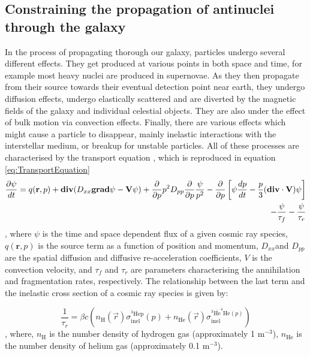 \subsection{Constraining the propagation of antinuclei through the galaxy}\label{sec:Propagation}
In the process of propagating thorough our galaxy, particles undergo several different effects. They get produced at various points in both space and time, for example most heavy nuclei are produced in supernovae\cite{}. As they then propagate from their source towards their eventual detection point near earth, they undergo diffusion effects, undergo elastically scattered and are diverted by the magnetic fields of the galaxy and individual celestial objects. They are also under the effect of bulk motion via convection effects. Finally, there are various effects which might cause a particle to disappear, mainly inelastic interactions with the interstellar medium, or breakup for unstable particles. All of these processes are characterised by the transport equation \cite{}, which is reproduced in equation \ref{eq:TransportEquation}
\begin{equation}
    \label{eq:TransportEquation}
    \centering
    \begin{split}
        \frac{\partial\psi}{dt} = q(\textbf{r},p) 
        + \mathrm{\textbf{div}}(D_{xx}\mathrm{\textbf{grad}}\psi - \textbf{V}\psi) + \frac{\partial}{\partial p}p^2D_{pp} \frac{\partial}{\partial p}\frac{\psi}{p^2} - \frac{\partial}{\partial p} \left[ \psi \frac{dp}{d t}   -\frac{p}{3} (\mathrm{\textbf{div}}\cdot  \mathrm{\textbf{V}} )\psi              \right] \\ 
        - \frac{\psi}{\tau_f}-\frac{\psi}{\tau_r}
    \end{split}
\end{equation}
, where $\psi$ is the time and space dependent flux of a given cosmic ray species, $q(\textbf{r},p)$ is the source term as a function of position and momentum, $D_{xx}$and $D_{pp}$ are the spatial diffusion and diffusive re-acceleration coefficients, $V$ is the convection velocity, and $\tau_f$ and $\tau_r$ are parameters characterising the annihilation and fragmentation rates, respectively. The relationship between the last term and the inelastic cross section of a cosmic ray species is given by: 

\begin{equation}\label{eq:annihilation_lossTerm_relation}
    \frac{1}{\tau_r} = \beta c \left( n_\mathrm{H}(\vec{r})\sigma_{\mathrm{inel}}^{^3\mathrm{\overline{He}p}} (p) + n_{\mathrm{He}}(\vec{r})\sigma_{\mathrm{inel}}^{^3\mathrm{\overline{He}^4He} (p)} 
    \right)
\end{equation},
where, $n_\mathrm{H}$ is the number density of hydrogen gas (approximately 1 m$^{-3}$), $n_\mathrm{He}$ is the number density of helium gas (approximately 0.1 m$^{-3}$). \\%

